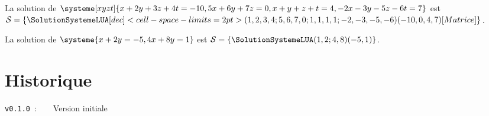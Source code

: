 \documentclass[a4paper,11pt]{article}
\begin{document}
\begin{PresentationCode}{}
La solution de $\systeme[xyzt]{x+2y+3z+4t=-10,5x+6y+7z=0,x+y+z+t=4,-2x-3y-5z-6t=7}$
est $\mathcal{S}=%
\left\lbrace
	\SolutionSystemeLUA%
		[dec]<cell-space-limits=2pt>%
		(1,2,3,4;5,6,7,0;1,1,1,1;-2,-3,-5,-6)(-10,0,4,7)%
		[Matrice]
\right\rbrace$.

La solution de $\systeme{x+2y=-5,4x+8y=1}$ est $\mathcal{S}=%
\left\lbrace \SolutionSystemeLUA(1,2;4,8)(-5,1) \right\rbrace$.
\end{PresentationCode}

\pagebreak

\part{Historique}

\verb|v0.1.0|~:~~~~Version initiale
\end{document}
